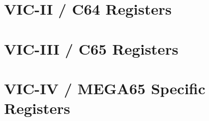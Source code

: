 \section{VIC-II / C64 Registers}



\section{VIC-III / C65 Registers}



\section{VIC-IV / MEGA65 Specific Registers}


